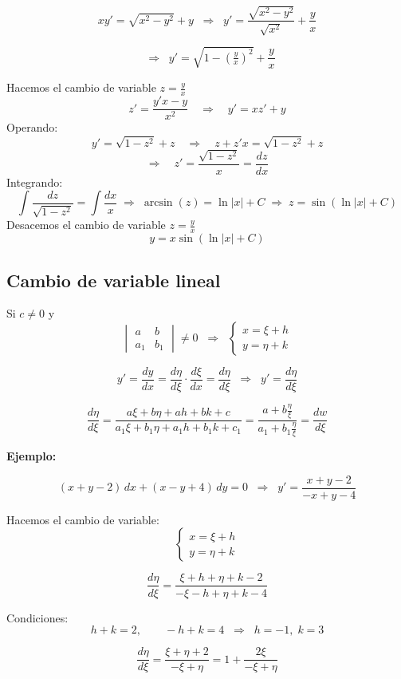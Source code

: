 \documentclass[a4paper,12pt]{article}
\begin{document}
\[
x y' = \sqrt{x^2 - y^2} + y 
\;\;\Rightarrow\;\;
y' = \frac{\sqrt{x^2 - y^2}}{\sqrt{x^2}} + \frac{y}{x}
\]

\[
\;\;\Rightarrow\;\; y' = \sqrt{1 - \left(\tfrac{y}{x}\right)^2} + \frac{y}{x}
\]

\newpage
\noindent
Hacemos el cambio de variable $z = \frac{y}{x}$
\[
z' = \frac{y'x - y}{x^2} \quad \Rightarrow \quad y' = x z' + y
\]
Operando:
\[
y' = \sqrt{1 - z^2} + z 
\quad \Rightarrow \quad 
z + z'x = \sqrt{1 - z^2} + z
\]
\[
\Rightarrow \quad z' = \frac{\sqrt{1-z^2}}{x} = \frac{dz}{dx}
\]
Integrando:
\[
\int \frac{dz}{\sqrt{1-z^2}} = \int \frac{dx}{x} \;\Rightarrow\; \arcsin(z) = \ln|x| + C \;\Rightarrow\; z = \sin(\ln|x| + C)
\]
Desacemos el cambio de variable $z = \frac{y}{x}$
\[
y = x \sin(\ln|x| + C)
\]

\subsection{Cambio de variable lineal}

Si $c \neq 0$ y 
\[
\begin{vmatrix}
a & b \\
a_1 & b_1
\end{vmatrix} \neq 0
\;\;\Rightarrow\;\;
\begin{cases}
x = \xi + h \\
y = \eta + k
\end{cases}
\]

\[
y' = \frac{dy}{dx} = \frac{d\eta}{d\xi}\cdot \frac{d\xi}{dx} 
= \frac{d\eta}{d\xi} \;\;\Rightarrow\;\; y' = \frac{d\eta}{d\xi}
\]

\[
\frac{d\eta}{d\xi} = 
\frac{a\xi + b\eta + ah + bk + c}{a_1\xi + b_1\eta + a_1 h + b_1 k + c_1}
= \frac{a + b\frac{\eta}{\xi}}{a_1 + b_1\frac{\eta}{\xi}}
= \frac{dw}{d\xi}
\]

\textbf{Ejemplo:}

\[
(x+y-2)\,dx + (x-y+4)\,dy = 0
\;\;\Rightarrow\;\;
y' = \frac{x+y-2}{-x+y-4}
\]

Hacemos el cambio de variable:
\[
\begin{cases}
x = \xi + h \\
y = \eta + k
\end{cases}
\]

\[
\frac{d\eta}{d\xi} = \frac{\xi + h + \eta + k - 2}{-\xi - h + \eta + k - 4}
\]

Condiciones:
\[
h+k=2, 
\qquad 
-h+k=4
\;\;\Rightarrow\;\;
h=-1, \; k=3
\]

\[
\frac{d\eta}{d\xi} = \frac{\xi + \eta + 2}{-\xi + \eta}
= 1 + \frac{2\xi}{-\xi + \eta}
\]
\end{document}
